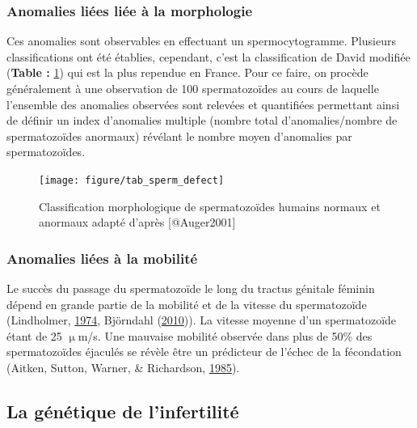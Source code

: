 \documentclass[12pt,twoside]{reedthesis}
\theoremstyle{definition}
\theoremstyle{definition}
\theoremstyle{remark}
\begin{document}
  \subsubsection{Anomalies liées liée à la
  morphologie}\label{anomalies-liees-liee-a-la-morphologie}
  
  Ces anomalies sont observables en effectuant un spermocytogramme.
  Plusieurs classifications ont été établies, cependant, c'est la
  classification de David modifiée (\textbf{Table :}
  \ref{fig:anomaliemorphosperm}) qui est la plus rependue en France. Pour
  ce faire, on procède généralement à une observation de 100
  spermatozoïdes au cours de laquelle l'ensemble des anomalies observées
  sont relevées et quantifiées permettant ainsi de définir un index
  d'anomalies multiple (nombre total d'anomalies/nombre de spermatozoïdes
  anormaux) révélant le nombre moyen d'anomalies par spermatozoïdes.
  
  \newpage  
  
  \begin{figure}
  
  {\centering \texttt{[image: figure/tab\_sperm\_defect]} 
  
  }
  
  \caption[Classification morphologique de spermatozoïdes humains normaux et anormaux adapté]{Classification morphologique de spermatozoïdes humains normaux et anormaux adapté d'après [@Auger2001]}\label{fig:anomaliemorphosperm}
  \end{figure}
  
  \newpage
  
  \subsubsection{Anomalies liées à la
  mobilité}\label{anomalies-liees-a-la-mobilite}
  
  Le succès du passage du spermatozoïde le long du tractus génitale
  féminin dépend en grande partie de la mobilité et de la vitesse du
  spermatozoïde (Lindholmer, \protect\hyperlink{ref-Lindholmer1974}{1974},
  Björndahl (\protect\hyperlink{ref-Bjorndahl2010}{2010})). La vitesse
  moyenne d'un spermatozoïde étant de 25 \(\upmu\)m/s. Une mauvaise
  mobilité observée dans plus de 50\% des spermatozoïdes éjaculés se
  révèle être un prédicteur de l'échec de la fécondation (Aitken, Sutton,
  Warner, \& Richardson, \protect\hyperlink{ref-Aitken1985}{1985}).
  
  \subsection{La génétique de
  l'infertilité}\label{la-genetique-de-linfertilite}
  
\end{document}
